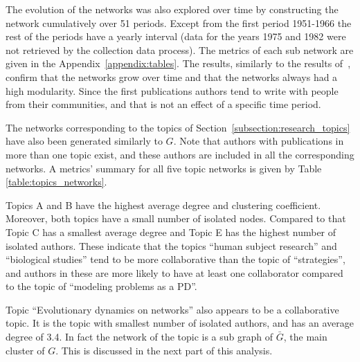 \documentclass{article}
\theoremstyle{definition}
\begin{document}
The evolution of the networks was also explored over time by constructing the
network cumulatively over 51 periods. Except from the first period 1951-1966 the
rest of the periods have a yearly interval (data for the years 1975 and 1982
were not retrieved by the collection data process). The metrics of each sub
network are given in the Appendix~\ref{appendix:tables}.
The results, similarly to the results of~\cite{Liu2015}, confirm that the
networks grow over time and that the networks always had a high modularity.
Since the first publications authors tend to write with people from their
communities, and that is not an effect of a specific time period.

The networks corresponding to the topics of Section~\ref{subsection:research_topics} have
also been generated similarly to \(G\). Note that authors with publications in
more than one topic exist, and these authors are included in all the corresponding
networks. A metrics' summary for all five topic networks is given by Table
\ref{table:topics_networks}.

Topics A and B have the highest average degree and clustering coefficient.
Moreover, both topics have a small number of isolated nodes. Compared to that
Topic C has a smallest average degree and Topic E has the highest number of
isolated authors. These indicate that the topics ``human subject research'' and
``biological studies'' tend to be more collaborative than the topic of
``strategies'', and authors in these are more likely to have at least one
collaborator compared to the topic of ``modeling problems as a PD''.

Topic ``Evolutionary dynamics on networks'' also appears to be a collaborative
topic. It is the topic with smallest number of isolated authors, and has an
average degree of 3.4. In fact the network of the topic is a
sub graph of \(\bar{G}\), the main cluster of $G$. This is discussed in the next
part of this analysis.
\end{document}
